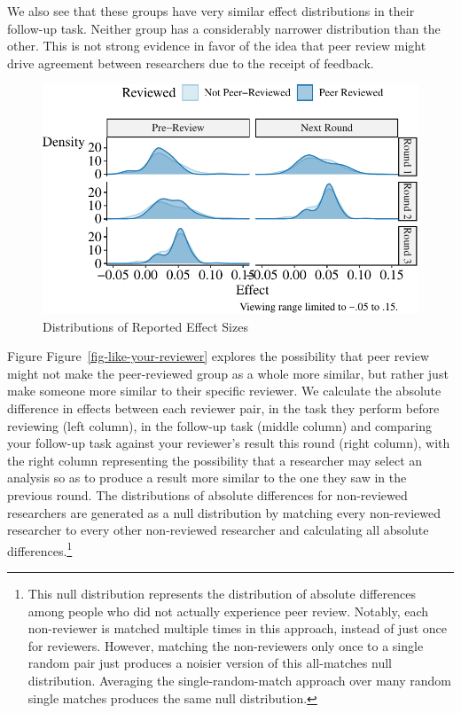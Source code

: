 \documentclass[
  letterpaper,
  DIV=11,
  numbers=noendperiod]{scrartcl}
\begin{document}
We also see that these groups have very similar effect distributions in
their follow-up task. Neither group has a considerably narrower
distribution than the other. This is not strong evidence in favor of the
idea that peer review might drive agreement between researchers due to
the receipt of feedback.

\begin{figure}

{\centering \includegraphics{The-Sources-of-Researcher-Variation-in-Economics_files/figure-pdf/fig-peer-review-effect-distributions-1.pdf}

}

\caption{\label{fig-peer-review-effect-distributions}Distributions of
Reported Effect Sizes}

\end{figure}

Figure Figure~\ref{fig-like-your-reviewer} explores the possibility that
peer review might not make the peer-reviewed group as a whole more
similar, but rather just make someone more similar to their specific
reviewer. We calculate the absolute difference in effects between each
reviewer pair, in the task they perform before reviewing (left column),
in the follow-up task (middle column) and comparing your follow-up task
against your reviewer's result this round (right column), with the right
column representing the possibility that a researcher may select an
analysis so as to produce a result more similar to the one they saw in
the previous round. The distributions of absolute differences for
non-reviewed researchers are generated as a null distribution by
matching every non-reviewed researcher to every other non-reviewed
researcher and calculating all absolute differences.\footnote{This null
  distribution represents the distribution of absolute differences among
  people who did not actually experience peer review. Notably, each
  non-reviewer is matched multiple times in this approach, instead of
  just once for reviewers. However, matching the non-reviewers only once
  to a single random pair just produces a noisier version of this
  all-matches null distribution. Averaging the single-random-match
  approach over many random single matches produces the same null
  distribution.}
\end{document}

